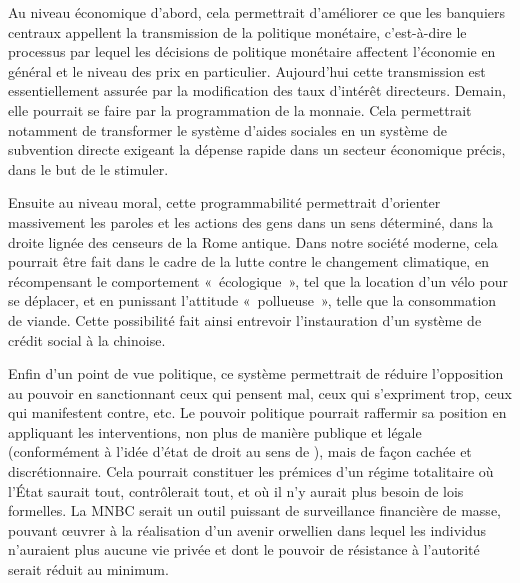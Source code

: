 Au niveau économique d'abord, cela permettrait d'améliorer ce que les banquiers centraux appellent la transmission de la politique monétaire, c'est-à-dire le processus par lequel les décisions de politique monétaire affectent l'économie en général et le niveau des prix en particulier. Aujourd'hui cette transmission est essentiellement assurée par la modification des taux d'intérêt directeurs. Demain, elle pourrait se faire par la programmation de la monnaie. Cela permettrait notamment de transformer le système d'aides sociales en un système de subvention directe exigeant la dépense rapide dans un secteur économique précis, dans le but de le stimuler.

Ensuite au niveau moral, cette programmabilité permettrait d'orienter massivement les paroles et les actions des gens dans un sens déterminé, dans la droite lignée des censeurs de la Rome antique. Dans notre société moderne, cela pourrait être fait dans le cadre de la lutte contre le changement climatique, en récompensant le comportement «~écologique~», tel que la location d'un vélo pour se déplacer, et en punissant l'attitude «~pollueuse~», telle que la consommation de viande. Cette possibilité fait ainsi entrevoir l'instauration d'un système de crédit social à la chinoise.

Enfin d'un point de vue politique, ce système permettrait de réduire l'opposition au pouvoir en sanctionnant ceux qui pensent mal, ceux qui s'expriment trop, ceux qui manifestent contre, etc. Le pouvoir politique pourrait raffermir sa position en appliquant les interventions, non plus de manière publique et légale (conformément à l'idée d'état de droit au sens de ), mais de façon cachée et discrétionnaire. Cela pourrait constituer les prémices d'un régime totalitaire où l'État saurait tout, contrôlerait tout, et où il n'y aurait plus besoin de lois formelles. La MNBC serait un outil puissant de surveillance financière de masse, pouvant œuvrer à la réalisation d'un avenir orwellien dans lequel les individus n'auraient plus aucune vie privée et dont le pouvoir de résistance à l'autorité serait réduit au minimum.

